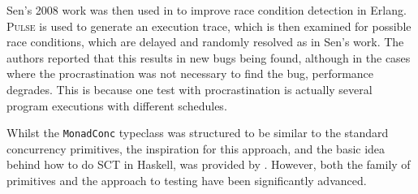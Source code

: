 Sen's 2008 work was then used in \citep{procrastination} to improve
race condition detection in Erlang. \textsc{Pulse} is used to generate
an execution trace, which is then examined for possible race
conditions, which are delayed and randomly resolved as in Sen's
work. The authors reported that this results in new bugs being found,
although in the cases where the procrastination was not necessary to
find the bug, performance degrades. This is because one test with
procrastination is actually several program executions with different
schedules.






Whilst the \verb|MonadConc| typeclass was structured to be similar to
the standard concurrency primitives, the inspiration for this
approach, and the basic idea behind how to do SCT in Haskell, was
provided by \citep{typeclass}. However, both the family of primitives
and the approach to testing have been significantly advanced.
